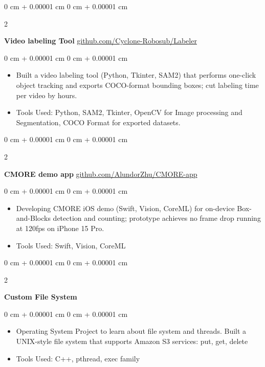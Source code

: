 \documentclass[10pt, letterpaper]{article}
\newenvironment{highlights}{
    \begin{itemize}[
        topsep=0.10 cm,
        parsep=0.10 cm,
        partopsep=0pt,
        itemsep=0pt,
        leftmargin=0 cm + 10pt
    ]
}{
    \end{itemize}
} %
\newenvironment{onecolentry}{
    \begin{adjustwidth}{
        0 cm + 0.00001 cm
    }{
        0 cm + 0.00001 cm
    }
}{
    \end{adjustwidth}
} %
\newenvironment{twocolentry}[2][]{
    \onecolentry
    \def\secondColumn{#2}
    \setcolumnwidth{\fill, 6 cm}
    \begin{paracol}{2}
}{
    \switchcolumn \raggedleft \secondColumn
    \end{paracol}
    \endonecolentry
} %
\begin{document}
        
        \begin{twocolentry}{
            \href{https://github.com/Cyclone-Robosub/Labeler}{github.com/Cyclone-Robosub/Labeler}
        }
            \textbf{Video labeling Tool}\end{twocolentry}

        \vspace{0.10 cm}
        \begin{onecolentry}
            \begin{highlights}
                \item Built a video labeling tool (Python, Tkinter, SAM2) that performs one-click object tracking and exports COCO-format bounding boxes; cut labeling time per video by hours.  
                \item Tools Used: Python, SAM2, Tkinter, OpenCV for Image processing and Segmentation, COCO Format for exported datasets. 
            \end{highlights}
        \end{onecolentry}


        \vspace{0.2 cm}

        \begin{twocolentry}{
            \href{https://github.com/AlundorZhu/CMORE-app}{github.com/AlundorZhu/CMORE-app}
        }
            \textbf{CMORE demo app}\end{twocolentry}

        \vspace{0.10 cm}
        \begin{onecolentry}
            \begin{highlights}
                \item Developing CMORE iOS demo (Swift, Vision, CoreML) for on-device Box-and-Blocks detection and counting; prototype achieves no frame drop running at 120fps on iPhone 15 Pro.
                \item Tools Used: Swift, Vision, CoreML
            \end{highlights}
        \end{onecolentry}


        \vspace{0.2 cm}

        \begin{twocolentry}{
            2023
        }
            \textbf{Custom File System}\end{twocolentry}

        \vspace{0.10 cm}
        \begin{onecolentry}
            \begin{highlights}
                \item Operating System Project to learn about file system and threads. Built a UNIX-style file system that supports Amazon S3 services: put, get, delete
                \item Tools Used: C++, pthread, exec family
            \end{highlights}
        \end{onecolentry}
\end{document}
